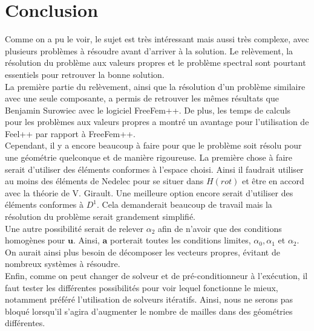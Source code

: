 \chapter*{Conclusion}
Comme on a pu le voir, le sujet est très intéressant mais aussi très complexe, avec plusieurs problèmes à résoudre avant d'arriver à la solution. Le relèvement, la résolution du problème aux valeurs propres et le problème spectral sont pourtant essentiels pour retrouver la bonne solution.\\

La première partie du relèvement, ainsi que la résolution d'un problème similaire avec une seule composante, a permis de retrouver les mêmes résultats que Benjamin Surowiec avec le logiciel FreeFem++. De plus, les temps de calculs pour les problèmes aux valeurs propres a montré un avantage pour l'utilisation de Feel++ par rapport à FreeFem++.\\

Cependant, il y a encore beaucoup à faire pour que le problème soit résolu pour une géométrie quelconque et de manière rigoureuse. La première chose à faire serait d'utiliser des éléments conformes à l'espace choisi. Ainsi il faudrait utiliser au moins des éléments de Nedelec pour se situer dans $H(rot)$ et être en accord avec la théorie de V. Girault. Une meilleure option encore serait d'utiliser des éléments conformes à $D^1$. Cela demanderait beaucoup de travail mais la résolution du problème serait grandement simplifié.\\

Une autre possibilité serait de relever $\alpha_2$ afin de n'avoir que des conditions homogènes pour $\bm{u}$. Ainsi, $\bm{a}$ porterait toutes les conditions limites, $\alpha_0,\alpha_1$ et $\alpha_2$. On aurait ainsi plus besoin de décomposer les vecteurs propres, évitant de nombreux systèmes à résoudre.\\

Enfin, comme on peut changer de solveur et de pré-conditionneur à l'exécution, il faut tester les différentes possibilités pour voir lequel fonctionne le mieux, notamment préféré l'utilisation de solveurs itératifs. Ainsi, nous ne serons pas bloqué lorsqu'il s'agira d'augmenter le nombre de mailles dans des géométries différentes.

